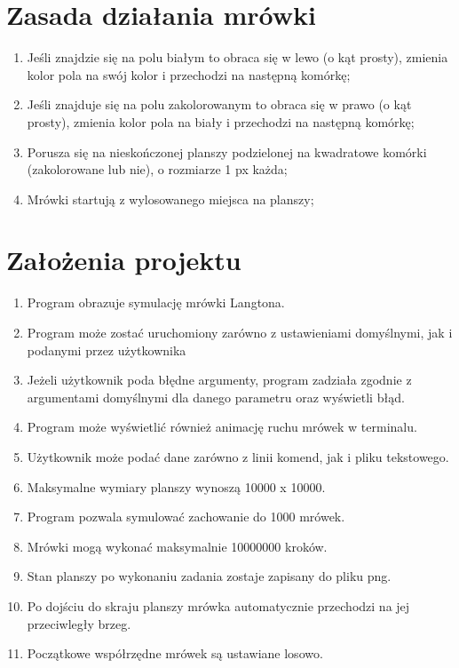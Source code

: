 \documentclass[a4paper,12pt]{article}
\begin{document}
\section{Zasada działania mrówki}
\begin{enumerate}
\item Jeśli znajdzie się na polu białym to obraca się w lewo (o kąt prosty), zmienia kolor pola na swój kolor i przechodzi na następną komórkę;
\item Jeśli znajduje się na polu zakolorowanym to obraca się w prawo (o kąt prosty), zmienia kolor pola na biały i przechodzi na następną komórkę;
\item Porusza się na nieskończonej planszy podzielonej na kwadratowe komórki (zakolorowane lub nie), o rozmiarze 1 px każda;
\item Mrówki startują z wylosowanego miejsca na planszy;
\end{enumerate}
\section{Założenia projektu}
\begin{enumerate}
\item Program obrazuje symulację mrówki Langtona.
\item Program może zostać uruchomiony zarówno z ustawieniami domyślnymi, jak i podanymi przez użytkownika
\item Jeżeli użytkownik poda błędne argumenty, program zadziała zgodnie z argumentami domyślnymi dla danego parametru oraz wyświetli błąd.
\item Program może wyświetlić również animację ruchu mrówek w terminalu.
\item Użytkownik może podać dane zarówno z linii komend, jak i pliku tekstowego.
\item Maksymalne wymiary planszy wynoszą 10000 x 10000.
\item Program pozwala symulować zachowanie do 1000 mrówek.
\item Mrówki mogą wykonać maksymalnie 10000000 kroków.
\item Stan planszy po wykonaniu zadania zostaje zapisany do pliku png.
\item Po dojściu do skraju planszy mrówka automatycznie przechodzi na jej przeciwległy brzeg.
\item Początkowe współrzędne mrówek są ustawiane losowo.
\end{enumerate}
\end{document}
